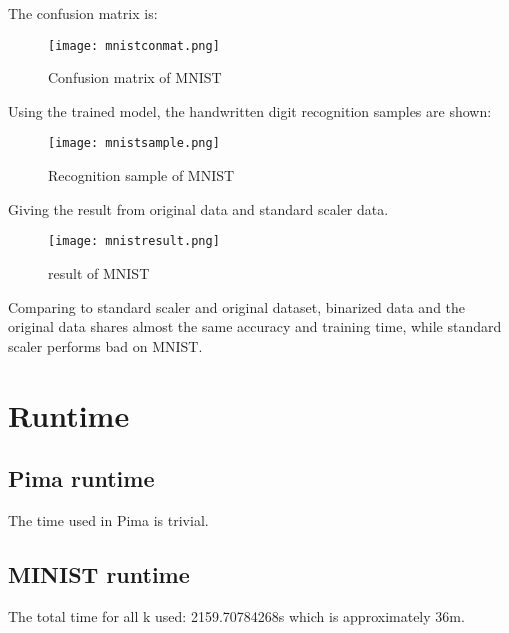 \documentclass{article}
\begin{document}
The confusion matrix is:
\begin{figure}[ht]
\centering

\texttt{[image: mnistconmat.png]}
\caption{Confusion matrix of MNIST}
\label{fig4.2.1}

\end{figure}
Using the trained model, the handwritten digit recognition samples are shown:\\
\begin{figure}[H]
\centering
\texttt{[image: mnistsample.png]}
\caption{Recognition sample of MNIST}
\label{fig4.2.2}

\end{figure}
Giving the result from original data and standard scaler data.\\
\begin{figure}[H]
\centering
\texttt{[image: mnistresult.png]}
\caption{result of MNIST}
\label{fig4.2.3}

\end{figure}
Comparing to standard scaler and original dataset, binarized data and the original data shares almost the same accuracy and training time, while standard scaler performs bad on MNIST.

\section{Runtime}
\subsection{Pima runtime}
The time used in Pima is trivial.
\subsection{MINIST runtime}
The total time for all k used: 2159.70784268s which is approximately 36m.









%

%

\end{document}
